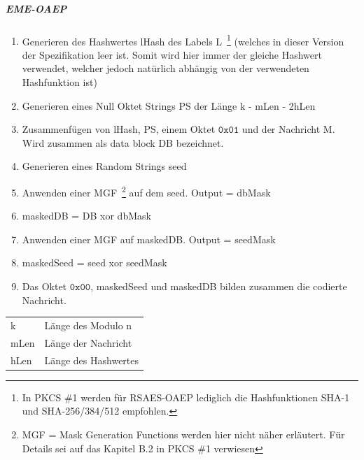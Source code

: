 \documentclass[10pt,a4paper]{article}
\begin{document}
\subparagraph{EME-OAEP}
\label{par:eme-oaep}
\begin{enumerate}
    \item Generieren des Hashwertes lHash des Labels L~\footnote{In PKCS \#1 werden für
        RSAES-OAEP lediglich die Hashfunktionen SHA-1 und SHA-256/384/512 empfohlen.}
        (welches in dieser Version der Spezifikation leer ist. Somit wird hier immer der
        gleiche Hashwert verwendet, welcher jedoch natürlich abhängig von der verwendeten
        Hashfunktion ist)
    \item Generieren eines Null Oktet Strings PS der Länge k - mLen - 2hLen
    \item Zusammenfügen von lHash, PS, einem Oktet $\mathtt{0x01}$ und der Nachricht M.
        Wird zusammen als data block DB bezeichnet.
    \item Generieren eines Random Strings seed
    \item Anwenden einer MGF~\footnote{MGF = Mask Generation Functions werden hier nicht
        näher erläutert. Für Details sei auf das Kapitel B.2 in PKCS \#1 verwiesen} auf
        dem seed. Output = dbMask
    \item maskedDB = DB xor dbMask
    \item Anwenden einer MGF auf maskedDB. Output = seedMask
    \item maskedSeed = seed xor seedMask
    \item Das Oktet $\mathtt{0x00}$, maskedSeed und maskedDB bilden zusammen die codierte
        Nachricht.
\end{enumerate}

\begin{table}[ht]
    \begin{tabular}{ll}
        k & Länge des Modulo n \\
        mLen & Länge der Nachricht \\
        hLen & Länge des Hashwertes
    \end{tabular}
\end{table}
\end{document}
